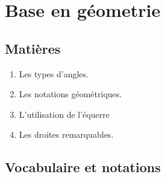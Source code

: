 \documentclass[../../syllabus_1.tex]{subfiles}
\begin{document}
\raggedbottom
\chapter{Base en géometrie}

\section*{Matières}
\begin{enumerate}[cols=2, label=\textbf{\arabic*.}]
    \item Les types d'angles.
    \item Les notations géométriques.
    \item L'utilisation de l'équerre
    \item Les droites remarquables.
\end{enumerate}

\section{Vocabulaire et notations}
\end{document}
